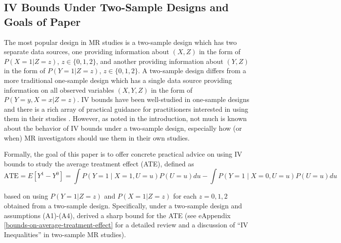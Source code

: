 \documentclass[
]{article}
\theoremstyle{plain}
\begin{document}
\hypertarget{iv-bounds-under-two-sample-designs-and-goals-of-paper}{%
\subsection{IV Bounds Under Two-Sample Designs and Goals of Paper}\label{iv-bounds-under-two-sample-designs-and-goals-of-paper}}

\label{review-study-designs-and-target-estimand}

The most popular design in MR studies is a two-sample design which has two separate data sources, one providing information about \((X,Z)\) in the form of \(P(X = 1 | Z = z)\), \(z \in \{0, 1, 2\}\), and another providing information about \((Y,Z)\) in the form of \(P(Y = 1 | Z = z)\), \(z \in \{0, 1, 2\}\). A two-sample design differs from a more traditional one-sample design which has a single data source providing information on all observed variables \((X,Y,Z)\) in the form of \(P(Y = y, X = x | Z = z)\). IV bounds have been well-studied in one-sample designs and there is a rich array of practical guidance for practitioners interested in using them in their studies \autocite{balke_bounds_1997,richardson_ace_2014,swanson_partial_2018}. However, as noted in the introduction, not much is known about the behavior of IV bounds under a two-sample design, especially how (or when) MR investigators should use them in their own studies.

Formally, the goal of this paper is to offer concrete practical advice on using IV bounds to study the average treatment effect (ATE), defined as
\[
\text{ATE} = E[Y^1 - Y^0] = \int P(Y=1 \mid X = 1, U=u) P(U=u) du - \int P(Y=1 \mid X = 0, U=u) P(U=u) du
\]

based on using \(P(Y = 1 | Z = z)\) and \(P(X = 1 | Z = z)\) for each \(z=0,1,2\) obtained from a two-sample design. Specifically, under a two-sample design and assumptions (A1)-(A4), \textcite{ramsahai_causal_2012} derived a sharp bound for the ATE (see eAppendix \ref{bounds-on-average-treatment-effect} for a detailed review and a discussion of ``IV Inequalities'' \autocite{balke_bounds_1997,diemer_application_2020} in two-sample MR studies).
\end{document}
